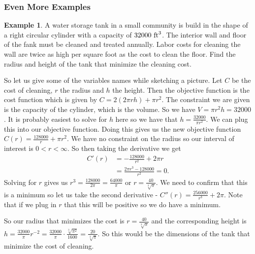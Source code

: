 \documentclass[12pt,reqno]{article}
\theoremstyle{definition}
\newtheorem*{Example}{Example}
\begin{document}
\subsubsection{Even More Examples}
	\begin{Example}
		A water storage tank in a small community is build in the shape of a right circular cylinder with a capacity of $32000 \textnormal{ ft}^3$. The interior wall and floor of the fank must be cleaned and treated annually. Labor costs for cleaning the wall are twice as high per square foot as the cost to clean the floor. Find the radius and height of the tank that minimize the cleaning cost. 
		
		So let us give some of the variables names while sketching a picture. Let $C$ be the cost of cleaning, $r$ the radius and $h$ the height. Then the objective function is the cost function which is given by $C = 2(2\pi rh) + \pi r^2$. 
		The constraint we are given is the capacity of the cylinder, which is the volume. So we have $V = \pi r^2 h = 32000$. It is probably easiest to solve for $h$ here so we have that $h = \frac{32000}{\pi r^2}$. We can plug this into our objective function. 
		Doing this gives us the new objective function $C(r) = \frac{128000}{r} + \pi r^2$. We have no constraint on the radius so our interval of interest is $0 < r < \infty$. So then taking the derivative we get 
		\begin{align*}
			C'(r) &= -\frac{128000}{r^2} + 2\pi r \\
				  &= \frac{2\pi r^3 - 128000}{r^2} = 0.
		\end{align*}
		Solving for $r$ gives us $r^3 = \frac{128000}{2 \pi} = \frac{64000}{\pi}$ or $r = \frac{40}{\sqrt[3]{\pi}}$. 
		We need to confirm that this is a minimum so let us take the second derivative - $C''(r) = \frac{256000}{r^3} + 2\pi$. Note that if we plug in $r$ that this will be positive so we do have a minimum. 
		
		So our radius that minimizes the cost is $r = \frac{40}{\sqrt[3]{\pi}}$ and the corresponding height is $h = \frac{32000}{\pi} r^{-2} = \frac{32000}{\pi} \cdot \frac{\sqrt[3]{\pi^2}}{1600} = \frac{20}{\sqrt[3]{\pi}}$. So this would be the dimensions of the tank that minimize the cost of cleaning.
	\end{Example}
	
\end{document}
